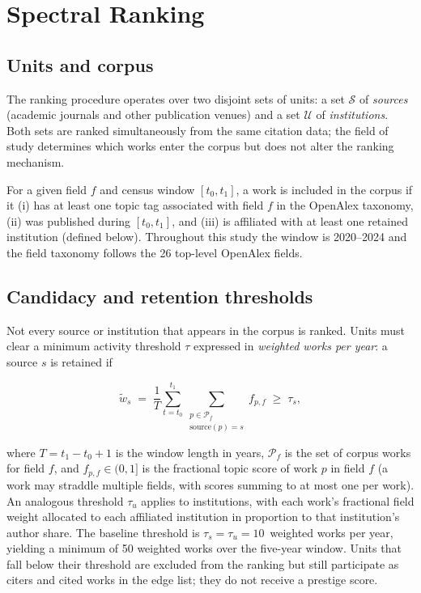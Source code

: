 \section{Spectral Ranking}
\label{sec:spectral_ranking}

\subsection{Units and corpus}

The ranking procedure operates over two disjoint sets of units: a set
$\mathcal{S}$ of \emph{sources} (academic journals and other publication
venues) and a set $\mathcal{U}$ of \emph{institutions}.  Both sets are ranked
simultaneously from the same citation data; the field of study determines
which works enter the corpus but does not alter the ranking mechanism.

For a given field $f$ and census window $[t_0, t_1]$, a work is included in
the corpus if it (i) has at least one topic tag associated with field $f$ in
the OpenAlex taxonomy, (ii) was published during $[t_0, t_1]$, and (iii) is
affiliated with at least one retained institution (defined below).  Throughout
this study the window is 2020--2024 and the field taxonomy follows the 26
top-level OpenAlex fields.

\subsection{Candidacy and retention thresholds}

Not every source or institution that appears in the corpus is ranked.  Units
must clear a minimum activity threshold $\tau$ expressed in
\emph{weighted works per year}: a source $s$ is retained if

\[
  \tilde{w}_s \;=\; \frac{1}{T}\sum_{t=t_0}^{t_1} \sum_{\substack{p \in \mathcal{P}_f \\ \mathrm{source}(p)=s}} f_{p,f}
  \;\geq\; \tau_s,
\]

where $T = t_1 - t_0 + 1$ is the window length in years, $\mathcal{P}_f$ is
the set of corpus works for field $f$, and $f_{p,f} \in (0,1]$ is the
fractional topic score of work $p$ in field $f$ (a work may straddle
multiple fields, with scores summing to at most one per work).  An analogous
threshold $\tau_u$ applies to institutions, with each work's fractional field
weight allocated to each affiliated institution in proportion to that
institution's author share.  The baseline threshold is $\tau_s = \tau_u =
10$~weighted works per year, yielding a minimum of 50 weighted works over the
five-year window.  Units that fall below their threshold are excluded from the
ranking but still participate as citers and cited works in the edge list; they
do not receive a prestige score.

